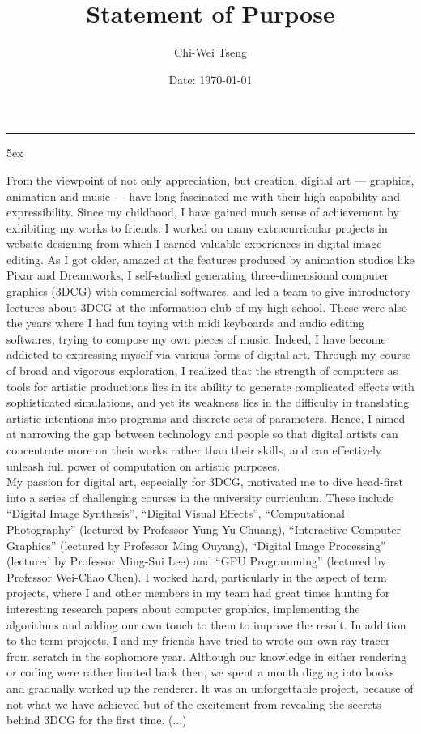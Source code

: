\documentclass[a4paper, 12pt]{article}
\title{Statement of Purpose}
\author{Chi-Wei Tseng}
\date{Date: \today}
\makeatletter
\newcommand{\HRule}{\rule{\linewidth}{0.2mm}}
\renewcommand{\maketitle}{
  \parindent=0pt%
  \begin{flushleft}
  \bf \large{\@author}
  \HRule
  \end{flushleft}
  \begin{center}
    \MakeUppercase{\bf \@title}
  \end{center}%
    \par
}
\makeatother
\begin{document}
{\linespread{0.8} \maketitle}
\parindent 5ex

From the viewpoint of not only appreciation, but creation, digital art --- graphics, animation and music --- have long fascinated me with their high capability and expressibility. Since my childhood, I have gained much sense of achievement by exhibiting my works to friends. I worked on many extracurricular projects in website designing from which I earned valuable experiences in digital image editing. As I got older, amazed at the features produced by animation studios like Pixar and Dreamworks, I self-studied generating three-dimensional computer graphics (3DCG) with commercial softwares, and led a team to give introductory lectures about 3DCG at the information club of my high school. These were also the years where I had fun toying with midi keyboards and audio editing softwares, trying to compose my own pieces of music. Indeed, I have become addicted to expressing myself via various forms of digital art. Through my course of broad and vigorous exploration, I realized that the strength of computers as tools for artistic productions lies in its ability to generate complicated effects with sophisticated simulations, and yet its weakness lies in the difficulty in translating artistic intentions into programs and discrete sets of parameters. Hence, I aimed at narrowing the gap between technology and people so that digital artists can concentrate more on their works rather than their skills, and can effectively unleash full power of computation on artistic purposes.\\


My passion for digital art, especially for 3DCG, motivated me to dive head-first into a series of challenging courses in the university curriculum. These include ``Digital Image Synthesis'', ``Digital Visual Effects'', ``Computational Photography'' (lectured by Professor Yung-Yu Chuang), ``Interactive Computer Graphics'' (lectured by Professor Ming Ouyang), ``Digital Image Processing'' (lectured by Professor Ming-Sui Lee) and ``GPU Programming'' (lectured by Professor Wei-Chao Chen). I worked hard, particularly in the aspect of term projects, where I and other members in my team had great times hunting for interesting research papers about computer graphics, implementing the algorithms and adding our own touch to them to improve the result. In addition to the term projects, I and my friends have tried to wrote our own ray-tracer from scratch in the sophomore year. Although our knowledge in either rendering or coding were rather limited back then, we spent a month digging into books and gradually worked up the renderer. It was an unforgettable project, because of not what we have achieved but of the excitement from revealing the secrets behind 3DCG for the first time. (...)\\
\end{document}
